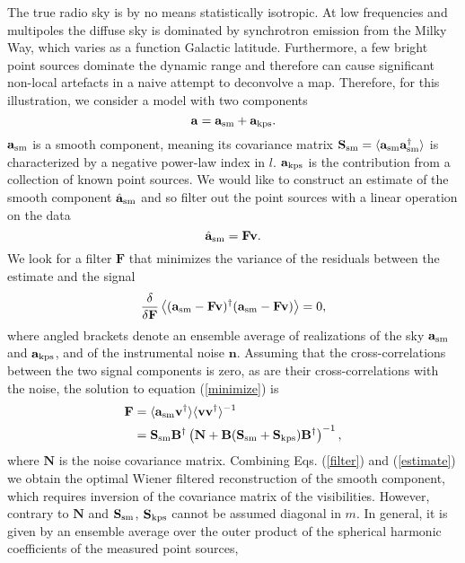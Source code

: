 The true radio sky is by no means statistically isotropic. At low frequencies and multipoles the diffuse sky is dominated by synchrotron emission from the Milky Way, which varies as a function Galactic latitude. Furthermore, a few bright point sources dominate the dynamic range and therefore can cause significant non-local artefacts in a naive attempt to deconvolve a map. Therefore, for this illustration, we consider a model with two components
\begin{equation}
\mathbf{a} = \mathbf{a}_{\rm sm} + \mathbf{a}_{\rm kps}.
\end{equation}
$\mathbf{a}_{\rm sm}$ is a smooth component, meaning its covariance matrix $\mathbf{S}_{\rm sm} = \langle \mathbf{a}_{\rm sm}\mathbf{a}_{\rm sm}^\dagger \rangle$ is characterized by a negative power-law index in $l$.
 $\mathbf{a}_{\rm kps}$ is the contribution from a collection of known point sources. We would like to construct an estimate of the smooth component $\hat{\mathbf{a}}_{\rm sm}$ and so filter out the point sources with a linear operation on the data \citep{wiener}
\begin{equation}
\hat{\mathbf{a}}_{\rm sm} = \mathbf{F}\mathbf{v}.
\label{estimate}
\end{equation}
We look for a filter $\mathbf{F}$ that minimizes the variance of the residuals between the estimate and the signal
\begin{equation}
\frac{\delta}{\delta \mathbf{F}} \left\langle (\mathbf{a}_{\rm sm} - \mathbf{F}\mathbf{v})^{\dagger} (\mathbf{a}_{\rm sm} - \mathbf{F}\mathbf{v}) \right\rangle = 0,
\label{minimize}
\end{equation}
where angled brackets denote an ensemble average of realizations of the sky $\mathbf{a}_{\rm sm}$ and $\mathbf{a}_{\rm kps}$, and of the instrumental noise $\mathbf{n}$. Assuming that the cross-correlations between the two signal components is zero, as are their cross-correlations with the noise, the solution to equation (\ref{minimize}) is
\begin{align}
\mathbf{F} &= \langle \mathbf{a}_{\rm sm}\mathbf{v}^\dagger \rangle \langle \mathbf{v}\mathbf{v}^{\dagger} \rangle^{-1} \\
&= \mathbf{S}_{\rm sm}\mathbf{B}^{\dagger}\left( \mathbf{N} + \mathbf{B}(\mathbf{S}_{\rm sm} + \mathbf{S}_{\rm kps})\mathbf{B}^{\dagger}\right)^{-1}, \label{filter}
\end{align}
where $\mathbf{N}$ is the noise covariance matrix. Combining Eqs. (\ref{filter}) and (\ref{estimate}) we obtain the optimal Wiener filtered reconstruction of the smooth component, which requires inversion of the covariance matrix of the visibilities. However, contrary to $\mathbf{N}$ and $\mathbf{S}_{\rm sm}$, $\mathbf{S}_{\rm kps}$ cannot be assumed diagonal in $m$. In general, it is given by an ensemble average over the outer product of the spherical harmonic coefficients of the measured point sources,
